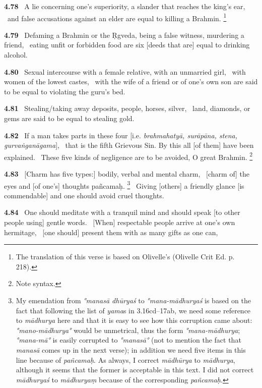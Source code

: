 \documentclass{article}
\newcommand{\skt}[1]{\textit{#1}}
\begin{document}
\textbf{4.78}%
\ A lie concerning one's superiority, a slander that reaches the king's ear,%
\ and false accusations against an elder are equal to killing a Brahmin.%
\footnote{The translation of this verse is based on Olivelle's (Olivelle Crit Ed. p. 218). }%


\textbf{4.79}%
\ Defaming a Brahmin or the Ṛgveda, being a false witness, murdering a friend,%
\ eating unfit or forbidden food are six [deeds that are] equal to drinking alcohol.%


\textbf{4.80}%
\ Sexual intercourse with a female relative, with an unmarried girl,%
\                  with women of the lowest castes,%
\ with the wife of a friend or of one's own son are said to be equal to violating the guru's bed.%


\textbf{4.81}%
\ Stealing/taking away deposits, people, horses, silver,%
\ land, diamonds, or gems are said to be equal to stealing gold.%


\textbf{4.82}%
\ If a man takes parts in these four [i.e. \skt{brahmahatyā, surāpāna, stena, gurvaṅganāgama}],%
\ that is the fifth Grievous Sin. By this all [of them] have been explained.%
\ These five kinds of negligence are to be avoided, O great Brahmin.%
\footnote{Note syntax. }%


\textbf{4.83}%
\ [Charm has five types:] bodily, verbal and mental charm,%
\                         [charm of] the eyes and [of one's] thoughts pañcamaḥ.%
\footnote{My emendation from \skt{°manasā dhūryaś} to \skt{°mana-mādhuryaś} is based on the fact that following the list                of \skt{yama}s in 3.16cd--17ab, we need some reference to \skt{mādhurya} here and that it is easy to see how this                 corruption came about: \skt{°mano-mādhurya°} would be unmetrical, thus the form \skt{°mana-mādhurya};                        \skt{°mana-mā°} is easily corrupted to \skt{°manasā°} (not to mention the fact                         that \skt{manasā} comes up in the next verse);                         in addition we need five items in this line because of \skt{pañcamaḥ}.                        As always, I correct \skt{mādhūrya} to \skt{mādhurya}, although it seems that                         the former is acceptable in this text.                         I did not correct \skt{mādhuryaś} to \skt{mādhuryaṃ} because of the corresponding                        \skt{pañcamaḥ}. }%
\ Giving [others] a friendly glance [is commendable] and one should avoid cruel thoughts.%


\textbf{4.84}%
\ One should meditate with a tranquil mind and should speak [to other people using] gentle words.%
\ [When] respectable people arrive at one's own hermitage,%
\                        [one should] present them with as many gifts as one can,%
\end{document}
